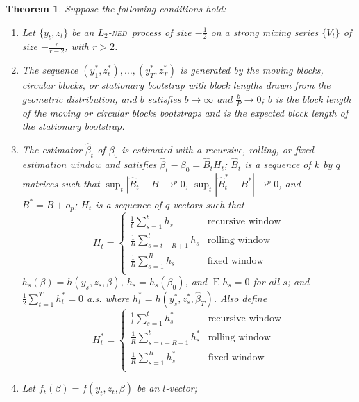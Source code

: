 \documentclass[11pt,fleqn]{article}
\newtheorem{thm}{Theorem}
\theoremstyle{definition}
\DeclareMathOperator{\E}{E}
\newcommand{\ned}{\textsc{ned}}
\begin{document}
\begin{thm}\label{res:3}
  Suppose the following conditions hold:
  \begin{enumerate}
  \item Let $\{y_t, z_t\}$ be an $L_2$-\ned\ process of size $-\frac12$ on
    a strong mixing series $\{V_t\}$ of size $-\frac{r}{r-2}$, with $r
    > 2$.
  \item The sequence $(y_1^{*}, z_t^*),\dots,(y_T^{*}, z_T^*)$ is
    generated by the moving blocks, circular blocks, or stationary
    bootstrap with block lengths drawn from the geometric
    distribution, and $b$ satisfies $b \to \infty$ and $\frac{b}{P}
    \to 0$; $b$ is the block length of the moving or circular blocks
    bootstraps and is the expected block length of the stationary
    bootstrap.
  \item The estimator $\hat{\beta}_t$ of $\beta_0$ is estimated with a
    recursive, rolling, or fixed estimation window and satisfies
    $\hat{\beta}_{t} - \beta_{0} = \hat{B}_{t} H_t$; $\hat{B}_{t}$ is
    a sequence of $k$ by $q$ matrices such that $\sup_t |\hat{B}_t -
    B| \to^p 0$, $\sup_t |\hat{B}_t^{*} - B^{*}| \to^p 0$, and $B^{*}
    = B + o_p$; $H_{t}$ is a sequence of $q$-vectors such that 
    \begin{equation}
      H_{t} = \begin{cases} 
        \tfrac1t \sum_{s=1}^t h_{s} & \text{recursive window} \\
        \tfrac1R \sum_{s=t-R+1}^t h_{s} & \text{rolling window} \\
        \tfrac1R \sum_{s=1}^R h_{s} & \text{fixed window} \\
      \end{cases}
    \end{equation}
    $h_{s}(\beta) = h(y_{s}, z_{s}, \beta)$, $h_s = h_s(\beta_0)$, and
    $\E h_{s} = 0$ for all $s$; and $\frac12 \sum_{t=1}^T h_t^* = 0$
    a.s. where $h_t^* = h(y_s^*, z_s^*, \hat\beta_T)$.  Also define
    \begin{equation}
      H_{t}^* = \begin{cases} 
        \tfrac1t \sum_{s=1}^t h_{s}^* & \text{recursive window} \\
        \tfrac1R \sum_{s=t-R+1}^t h_{s}^* & \text{rolling window} \\
        \tfrac1R \sum_{s=1}^R h_{s}^* & \text{fixed window} \\
      \end{cases}
    \end{equation}
  \item Let $f_{t}(\beta) = f(y_{t}, z_{t}, \beta)$ be an $l$-vector;

\end{enumerate}
\end{thm}
\end{document}
